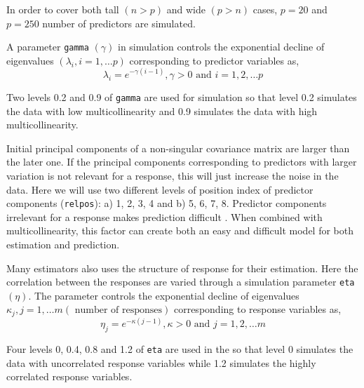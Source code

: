 \documentclass[12pt,3p,authoryear]{elsarticle}
\providecommand{\tightlist}{%
  \setlength{\itemsep}{0pt}\setlength{\parskip}{0pt}}
\begin{document}
\begin{description}
\tightlist
\item[\textbf{Number of predictors: (\texttt{p})}]
In order to cover both tall \((n>p)\) and wide \((p>n)\) cases, \(p= 20\) and \(p= 250\) number of predictors are simulated.
\item[\textbf{Multicollinearity in predictor variables: (\texttt{gamma})}]
A parameter \texttt{gamma} \((\gamma)\) in simulation controls the exponential decline of eigenvalues \((\lambda_i, i = 1, \ldots p)\) corresponding to predictor variables as,
\begin{equation}
  \lambda_i = e^{-\gamma(i-1)}, \gamma > 0 \text{ and } i = 1, 2, \ldots p
  \label{eq:gamma}
  \end{equation}

Two levels 0.2 and 0.9 of \texttt{gamma} are used for simulation so that level 0.2 simulates the data with low multicollinearity and 0.9 simulates the data with high multicollinearity.
\item[\textbf{Position of relevant components: (\texttt{relpos})}]
Initial principal components of a non-singular covariance matrix are larger than the later one. If the principal components corresponding to predictors with larger variation is not relevant for a response, this will just increase the noise in the data. Here we will use two different levels of position index of predictor components (\texttt{relpos}): a) 1, 2, 3, 4 and b) 5, 6, 7, 8. Predictor components irrelevant for a response makes prediction difficult \citep{Helland1994b}. When combined with multicollinearity, this factor can create both an easy and difficult model for both estimation and prediction.
\item[\textbf{Correlation in response variables: (\texttt{eta})}]
Many estimators also uses the structure of response for their estimation. Here the correlation between the responses are varied through a simulation parameter \texttt{eta} \((\eta)\). The parameter controls the exponential decline of eigenvalues \(\kappa_j, j = 1, \ldots m (\text{ number of responses})\) corresponding to response variables as,
\begin{equation}
\eta_j = e^{-\kappa(j-1)}, \kappa > 0 \text{ and } j = 1, 2, \ldots m
\label{eq:eta}
\end{equation}

Four levels 0, 0.4, 0.8 and 1.2 of \texttt{eta} are used in the so that level 0 simulates the data with uncorrelated response variables while 1.2 simulates the highly correlated response variables.
\end{description}
\end{document}
